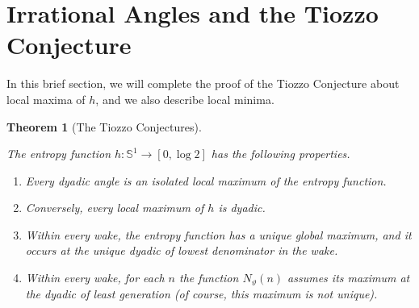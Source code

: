 \documentclass[12pt]{amsart}
\newcommand{\Circle}{\mathbb S^1}
\newcommand{\0}{\texttt{0}}
\newcommand{\1}{\texttt{1}}
\newtheorem{theorem}{Theorem}[section]
\theoremstyle{definition}
\numberwithin{equation}{section}
\renewcommand{\theta}{\vartheta}
\newcommand{\lineclear}{\rule{0pt}{2pt}\newline}
\begin{document}
\section{Irrational Angles and the Tiozzo Conjecture}
\label{Sec:IrrationalTiozzoConj}

In this brief section, we will complete the proof of the Tiozzo Conjecture about local maxima of $h$, and we also describe local minima.





\begin{theorem}[The Tiozzo Conjectures]
\label{Thm:TiozzoConj} \lineclear
The entropy function $h\colon\Circle\to[0,\log 2]$ has the following properties.
\begin{enumerate}
\item[a)] 
Every dyadic angle is an isolated local maximum of the entropy function.

\item[b)]
Conversely, every local maximum of $h$ is dyadic. 
\item[c)] 
Within every wake, the entropy function has a unique global maximum, and it occurs at the unique dyadic of lowest denominator in the wake.

\item[d)]
Within every wake, for each $n$ the function $N_\theta(n)$ assumes its  maximum at the dyadic of least generation (of course, this maximum is not unique).
\end{enumerate}
\end{theorem}
\end{document}
